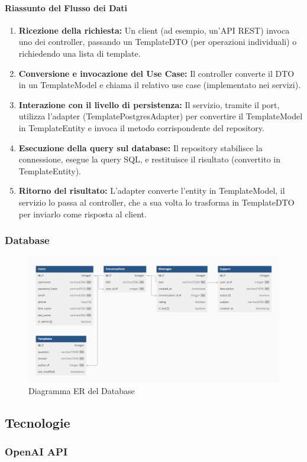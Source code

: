     \paragraph{Riassunto del Flusso dei Dati}
    \begin{enumerate}
        \item \textbf{Ricezione della richiesta:} Un client (ad esempio, un’API REST) invoca uno dei controller, passando un TemplateDTO (per operazioni individuali) o richiedendo una lista di template.
        \item \textbf{Conversione e invocazione del Use Case:} Il controller converte il DTO in un TemplateModel e chiama il relativo use case (implementato nei servizi).
        \item \textbf{Interazione con il livello di persistenza:} Il servizio, tramite il port, utilizza l’adapter (TemplatePostgresAdapter) per convertire il TemplateModel in TemplateEntity e invoca il metodo corrispondente del repository.
        \item \textbf{Esecuzione della query sul database:} Il repository stabilisce la connessione, esegue la query SQL, e restituisce il risultato (convertito in TemplateEntity).
        \item \textbf{Ritorno del risultato:} L’adapter converte l’entity in TemplateModel, il servizio lo passa al controller, che a sua volta lo trasforma in TemplateDTO per inviarlo come risposta al client.
    \end{enumerate}
    
    
    \subsubsection{Database}
\begin{figure}[H]
    \centering
    \includegraphics[width=\linewidth, height=0.8\textheight, keepaspectratio]{./img/DB_ER.png}
    \caption{Diagramma ER del Database}
    \label{fig:db_er}
\end{figure}






\subsection{Tecnologie}
\subsubsection{OpenAI API}

